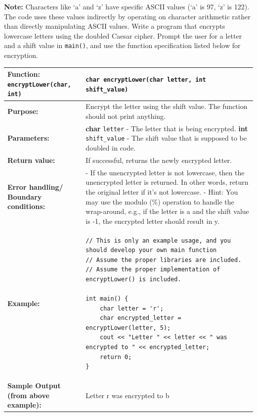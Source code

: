 \bigbreak
\textbf{Note:} Characters like `a' and `z' have specific ASCII values (`a' is 97, `z' is 122). The code uses these values indirectly by operating on character arithmetic rather than directly manipulating ASCII values.
\bigbreak
Write a program that encrypts lowercase letters using the doubled Caesar cipher. Prompt the user for a letter and a shift value in \texttt{main()}, and use the function specification listed below for encryption.


\bigbreak

\begin{longtable}{|p{1.7in}|p{4.0in}|}
\hline
\textbf{Function:} \texttt{encryptLower(char, int)} & \texttt{char encryptLower(char letter, int shift_value)}\\ \hline

\textbf{Purpose:} & Encrypt the letter using the shift value. The function should not print anything. \\ \hline

\textbf{Parameters:} & 
\textbf{char} \texttt{letter} - The letter that is being encrypted. \newline
\textbf{int} \texttt{shift\_value} - The shift value that is supposed to be doubled in code. \\ \hline

\textbf{Return value:} & If successful, returns the newly encrypted letter. \\ \hline

\textbf{Error handling/} \newline
\textbf{Boundary conditions:} & 
- If the unencrypted letter is not lowercase, then the unencrypted letter is returned. In other words, return the original letter if it's not lowercase. \newline 
- Hint: You may use the modulo (\%) operation to handle the wrap-around, e.g., if the letter is a and the shift value is -1, the encrypted letter should result in y. \\ \hline

\textbf{Example:} & 
\begin{verbatim}
// This is only an example usage, and you should develop your own main function
// Assume the proper libraries are included.
// Assume the proper implementation of encryptLower() is included.

int main() {
    char letter = 'r';
    char encrypted_letter = encryptLower(letter, 5);
    cout << "Letter " << letter << " was encrypted to " << encrypted_letter;
    return 0;
}

\end{verbatim} 

\\ \hline

\textbf{Sample Output (from above example):} & Letter r was encrypted to b \\ \hline

\end{longtable}

